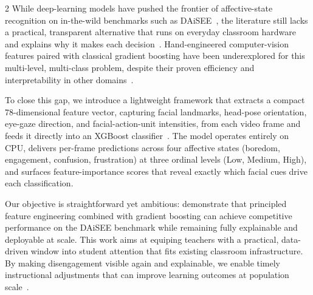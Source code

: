 \begin{multicols}{2}
  While deep-learning models have pushed the frontier of affective-state recognition on in-the-wild benchmarks such as DAiSEE~\cite{Gupta2016DAiSEETU}, the literature still lacks a practical, transparent alternative that runs on everyday classroom hardware and explains why it makes each decision~\cite{Khosravi2022ExplainableAI, CortiasLorenzo2023TowardEA}. Hand-engineered computer-vision features paired with classical gradient boosting have been underexplored for this multi-level, multi-class problem, despite their proven efficiency and interpretability in other domains~\cite{Hossen2023AttentionMO, Das2025OptimizingSE}.

  To close this gap, we introduce a lightweight framework that extracts a compact 78-dimensional feature vector, capturing facial landmarks, head-pose orientation, eye-gaze direction, and facial-action-unit intensities, from each video frame and feeds it directly into an XGBoost classifier~\cite{Chen2016XGBoostAS}. The model operates entirely on CPU, delivers per-frame predictions across four affective states (boredom, engagement, confusion, frustration) at three ordinal levels (Low, Medium, High), and surfaces feature-importance scores that reveal exactly which facial cues drive each classification.

  Our objective is straightforward yet ambitious: demonstrate that principled feature engineering combined with gradient boosting can achieve competitive performance on the DAiSEE benchmark while remaining fully explainable and deployable at scale. %
  This work aims at equiping teachers with a practical, data-driven window into student attention that fits existing classroom infrastructure. By making disengagement visible again and explainable, we enable timely instructional adjustments that can improve learning outcomes at population scale~\cite{Khosravi2022ExplainableAI}.

\end{multicols}
